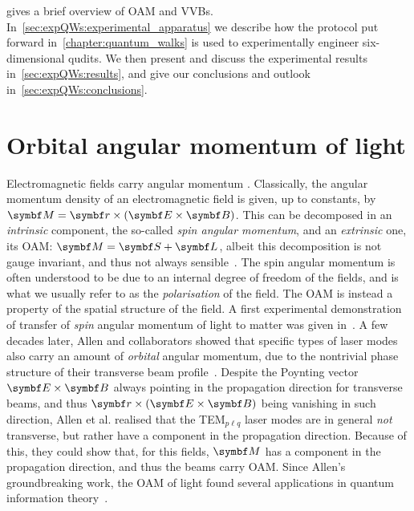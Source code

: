  gives a brief overview of \ac{OAM} and \acp{VVB}.
In~\cref{sec:expQWs:experimental_apparatus} we describe how the protocol put forward in~\cref{chapter:quantum_walks} is used to experimentally engineer six-dimensional qudits.
We then present and discuss the experimental results in~\cref{sec:expQWs:results}, and give our conclusions and outlook in~\cref{sec:expQWs:conclusions}.


\section{Orbital angular momentum of light}
\label{sec:expQWs:OAMintro}

Electromagnetic fields carry angular momentum \cite{jackson1999classical}.
Classically, the angular momentum density of an electromagnetic field is given, up to constants, by
$\bs M =\bs r\times(\bs E\times \bs B)$. This can be decomposed in an \emph{intrinsic} component, the so-called \emph{spin angular momentum}, and an \emph{extrinsic} one, its \ac{OAM}: $\bs M=\bs S+\bs L$, albeit this decomposition is not gauge invariant, and thus not always sensible~\cite{ohanian1986what,cameron2015azimuthal}.
The spin angular momentum is often understood to be due to an internal degree of freedom of the fields, and is what we usually refer to as the \emph{polarisation} of the field. The OAM is instead a property of the spatial structure of the field.
A first experimental demonstration of transfer of \emph{spin} angular momentum of light to matter was given in~\cite{beth1936mechanical}. A few decades later, Allen and collaborators showed that specific types of laser modes also carry an amount of \emph{orbital} angular momentum, due to the nontrivial phase structure of their transverse beam profile~\cite{allen1992orbital}.
Despite the Poynting vector $\bs E\times \bs B$ always pointing in the propagation direction for transverse beams, and thus $\bs r\times(\bs E\times\bs B)$ being vanishing in such direction, Allen et al. realised that the TEM$_{p\ell q}$ laser modes are in general \emph{not} transverse, but rather have a component in the propagation direction. Because of this, they could show that, for this fields, $\bs M$ has a component in the propagation direction, and thus the beams carry OAM.
Since Allen's groundbreaking work, the OAM of light found several applications in quantum information theory~\cite{allen1999orbital,padgett2004lights,barnett2007orbital,molina-terriza2007twisted,franke-arnold2008advances,yao2011orbital,padgett2017orbital,erhard2017twisted,cozzolino2019highdimensional}.
